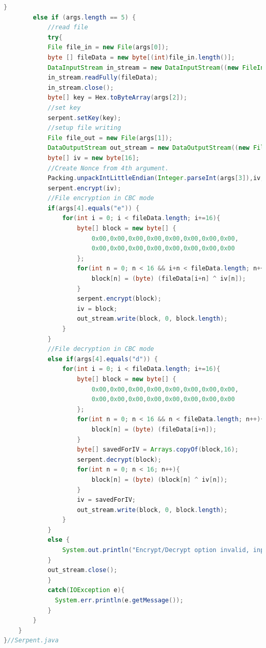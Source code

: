\documentclass[12pt]{article} %
\begin{document}
\begin{lstlisting}[language=Java, basicstyle=\small, breaklines=true]
        }
        else if (args.length == 5) {
            //read file
            try{
            File file_in = new File(args[0]);
            byte [] fileData = new byte[(int)file_in.length()];
            DataInputStream in_stream = new DataInputStream((new FileInputStream(file_in)));
            in_stream.readFully(fileData);
            in_stream.close();
            byte[] key = Hex.toByteArray(args[2]);
            //set key
            serpent.setKey(key);
            //setup file writing
            File file_out = new File(args[1]);
            DataOutputStream out_stream = new DataOutputStream((new FileOutputStream(file_out)));
            byte[] iv = new byte[16];
            //Create Nonce from 4th argument.
            Packing.unpackIntLittleEndian(Integer.parseInt(args[3]),iv,0);
            serpent.encrypt(iv);
            //File encryption in CBC mode
            if(args[4].equals("e")) {
                for(int i = 0; i < fileData.length; i+=16){
                    byte[] block = new byte[] {
                        0x00,0x00,0x00,0x00,0x00,0x00,0x00,0x00,
                        0x00,0x00,0x00,0x00,0x00,0x00,0x00,0x00
                    };
                    for(int n = 0; n < 16 && i+n < fileData.length; n++){
                        block[n] = (byte) (fileData[i+n] ^ iv[n]);
                    }
                    serpent.encrypt(block);
                    iv = block;
                    out_stream.write(block, 0, block.length);
                }
            }
            //File decryption in CBC mode
            else if(args[4].equals("d")) {
                for(int i = 0; i < fileData.length; i+=16){
                    byte[] block = new byte[] {
                        0x00,0x00,0x00,0x00,0x00,0x00,0x00,0x00,
                        0x00,0x00,0x00,0x00,0x00,0x00,0x00,0x00
                    };
                    for(int n = 0; n < 16 && n < fileData.length; n++){
                        block[n] = (byte) (fileData[i+n]);
                    }
                    byte[] savedForIV = Arrays.copyOf(block,16);
                    serpent.decrypt(block);
                    for(int n = 0; n < 16; n++){
                        block[n] = (byte) (block[n] ^ iv[n]);
                    }
                    iv = savedForIV;
                    out_stream.write(block, 0, block.length);
                }
            }
            else {
                System.out.println("Encrypt/Decrypt option invalid, input e or d as 5th argument.");
            }
            out_stream.close();
            }
            catch(IOException e){
              System.err.println(e.getMessage());
            }
        }
    }
}//Serpent.java
\end{lstlisting}
\end{document}
